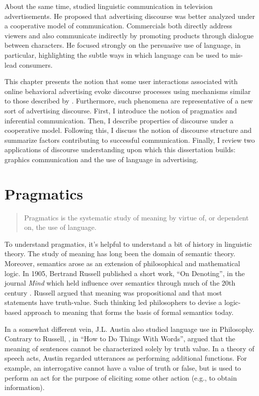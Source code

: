 About the same time,  \cite{Geis:1982uf}  studied linguistic communication in television advertisements. He proposed that advertising discourse was better analyzed under a cooperative model of communication. Commercials both directly address viewers and also communicate indirectly by promoting products through dialogue between characters. He focused strongly on the persuasive use of language, in particular, highlighting the subtle ways in which language can be used to mis-lead consumers.

This chapter presents the notion that some user interactions associated with online behavioral advertising evoke discourse processes using mechanisms similar to those described by  \cite{Geis:1982uf}.  Furthermore, such phenomena are representative of a new sort of advertising discourse. First, I introduce the notion of pragmatics and inferential communication. Then, I describe properties of discourse under a cooperative model. Following this, I discuss the notion of discourse structure and summarize factors contributing to successful communication. Finally, I review two applications of discourse understanding upon which this dissertation builds: graphics communication and the use of language in advertising. 

\section{Pragmatics}
\label{pragmatics}


\begin{quote}
Pragmatics is the systematic study of meaning by virtue of, or dependent on, the use of language. \cite[p. 2]{Huang:2007ww}
\end{quote} 


To understand pragmatics, it's helpful to understand a bit of history in linguistic theory. The study of meaning has long been the domain of semantic theory. Moreover, semantics arose as an extension of philosophical and mathematical logic. In 1905, Bertrand Russell published a short work, ``On Denoting'', in the journal \emph{Mind} which held influence over semantics through much of the 20th century  \citep{Russell:1905tj}.  Russell argued that meaning was propositional and that most statements have truth-value. Such thinking led philosophers to devise a logic-based approach to meaning that forms the basis of formal semantics today.

In a somewhat different vein, J.L. Austin also studied language use in Philosophy. Contrary to Russell,  \cite{Austin:1975vd},  in ``How to Do Things With Words'', argued that the meaning of sentences cannot be characterized solely by truth value. In a theory of speech acts, Austin regarded utterances as performing additional functions. For example, an interrogative cannot have a value of truth or false, but is used to perform an act for the purpose of eliciting some other action (e.g., to obtain information).

